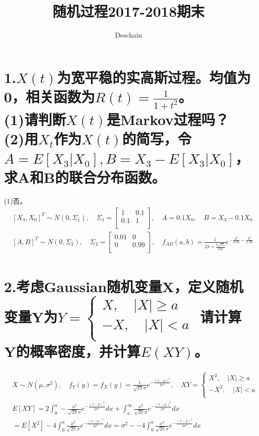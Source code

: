 \documentclass[UTF8]{ctexart}
\title{随机过程2017-2018期末}
\author{Deschain}
\begin{document}
\maketitle
\section*{1.$X(t)$为宽平稳的实高斯过程。均值为0，相关函数为$R(t)=\frac{1}{1+t^2}$。\\
(1)请判断$X(t)$是Markov过程吗？\\
(2)用$X_t$作为$X(t)$的简写，令$A=E[X_3\lvert X_0],B=X_3-E[X_3\lvert X_0]$，求A和B的联合分布函数。}
(1)否。
\begin{equation*}
  \begin{aligned}
     & [X_3,X_0]^T\sim N(0,\Sigma_1),\quad\Sigma_1=
    \begin{bmatrix}
      1   & 0.1 \\
      0.1 & 1   \\
    \end{bmatrix},\quad A=0.1X_0,\quad B=X_3-0.1X_0 \\
     & [A,B]^T\sim N(0,\Sigma_2),\quad\Sigma_2=
    \begin{bmatrix}
      0.01 & 0    \\
      0    & 0.99 \\
    \end{bmatrix},\quad f_{AB}(a,b)=\frac{1}{2\pi\times\frac{3\sqrt{11}}{100}}
    e^{-\frac{a^2}{0.02}-\frac{b^2}{1.98}}                      \\
  \end{aligned}
\end{equation*}
\section*{2.考虑Gaussian随机变量X，定义随机变量Y为$Y=
    \begin{cases}
      X,\quad\lvert X\rvert\geq a \\
      -X,\quad\lvert X\rvert<a    \\
    \end{cases}$
  请计算Y的概率密度，并计算$E(XY)$。}
\begin{equation*}
  \begin{aligned}
     & X\sim N(\mu,\sigma^2),\quad f_Y(y)=f_X(y)=\frac{1}{\sqrt{2\pi}\sigma}
    e^{-\frac{(x-\mu)^2}{2\sigma^2}},\quad XY=
    \begin{cases}
      X^2,\quad\lvert X\rvert\geq a \\
      -X^2,\quad\lvert X\rvert<a    \\
    \end{cases}                                                            \\
     & E[XY]=2\int_0^a-\frac{x^2}{\sqrt{2\pi}\sigma} e^{-\frac{(x-\mu)^2}{2\sigma^2}}dx
    +\int_a^\infty\frac{x^2}{\sqrt{2\pi}\sigma} e^{-\frac{(x-\mu)^2}{2\sigma^2}}dx       \\
     & =E[X^2]-4\int_0^a\frac{x^2}{\sqrt{2\pi}\sigma} e^{-\frac{(x-\mu)^2}{2\sigma^2}}dx
    =\sigma^2--4\int_0^a\frac{x^2}{\sqrt{2\pi}\sigma} e^{-\frac{(x-\mu)^2}{2\sigma^2}}dx \\
  \end{aligned}
\end{equation*}
\end{document}
